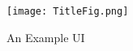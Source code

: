 \maketitle

\vfill

\begin{figure}[h]
    \centering
    \texttt{[image: TitleFig.png]}
    \caption{An Example UI \cite{Russell2008LabelMe}}
    \label{fig:frontmatter}
\end{figure}

\vfill
